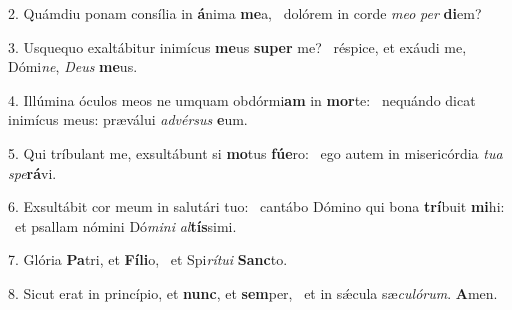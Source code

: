 2. Quámdiu ponam consília in \textbf{á}nima \textbf{me}a, \ast\  dolórem in corde \textit{me}\textit{o} \textit{per} \textbf{di}em?\

3. Usquequo exaltábitur inimícus \textbf{me}us \textbf{su}\textbf{per} me? \ast\  réspice, et exáudi me, Dómi\textit{ne}, \textit{De}\textit{us} \textbf{me}us.\

4. Illúmina óculos meos ne umquam obdórmi\textbf{am} in \textbf{mor}te: \ast\  nequándo dicat inimícus meus: præválui \textit{ad}\textit{vér}\textit{sus} \textbf{e}um.\

5. Qui tríbulant me, exsultábunt si \textbf{mo}tus \textbf{fú}\textbf{e}ro: \ast\  ego autem in misericórdia \textit{tu}\textit{a} \textit{spe}\textbf{rá}vi.\

6. Exsultábit cor meum in salutári tuo: \dag\  cantábo Dómino qui bona \textbf{trí}buit \textbf{mi}hi: \ast\  et psallam nómini Dó\textit{mi}\textit{ni} \textit{al}\textbf{tís}simi.\

7. Glória \textbf{Pa}tri, et \textbf{Fí}\textbf{li}o, \ast\  et Spi\textit{rí}\textit{tu}\textit{i} \textbf{Sanc}to.\

8. Sicut erat in princípio, et \textbf{nunc}, et \textbf{sem}per, \ast\  et in sǽcula sæ\textit{cu}\textit{ló}\textit{rum}. \textbf{A}men.\


